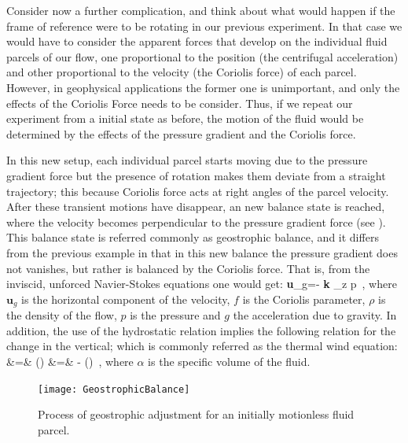 Consider now a further complication, and think about what would happen if
the frame of reference were to be rotating in our previous experiment. In
that case we would have to consider the apparent forces that develop on
the individual fluid parcels of our flow, one proportional to the
position (the centrifugal acceleration) and other proportional to the
velocity (the Coriolis force) of each parcel. However, in geophysical
applications the former one is unimportant, and only the
effects of the Coriolis Force needs to be consider. Thus, if we repeat
our experiment from a initial state as before, the motion of the fluid
would be determined by the effects of the pressure gradient and the
Coriolis force.

In this new setup, each individual parcel starts moving due to the
pressure gradient force but the presence of rotation makes them deviate
from a straight trajectory; this because Coriolis force acts at right
angles of the parcel velocity. After these transient motions have
disappear, an new balance state is reached, where the velocity becomes
perpendicular to the pressure gradient force (see ).
This balance state is referred commonly as geostrophic balance, and it
differs from the previous example in that in this new balance the
pressure gradient does not vanishes, but rather is balanced by the
Coriolis force. That is, from the inviscid, unforced Navier-Stokes
equations one would get:
\beq
\textbf{u}_g=- \textbf{k} \times \nabla_z p
\,,
where $\textbf{u}_g$ is the horizontal component of the velocity, $f$ is
the Coriolis parameter, $\rho$ is the density of the flow, $p$ is the
pressure and $g$ the acceleration due to gravity. In addition, the use of
the hydrostatic relation implies the following relation for the change in
the vertical; which is commonly referred as the thermal wind
equation:
\bea
{}
    &=&  \left(\right)
\continue
{}
    &=& - \left(\right)
\,,
\label{eq:TWE}
\eea
where $\alpha$ is the specific volume of the fluid.

\begin{figure}
\begin{center}
  \texttt{[image: GeostrophicBalance]}\\
\end{center}
  \caption{Process of geostrophic adjustment for an initially motionless fluid parcel.}
  \label{f:GBalance}
\end{figure}

